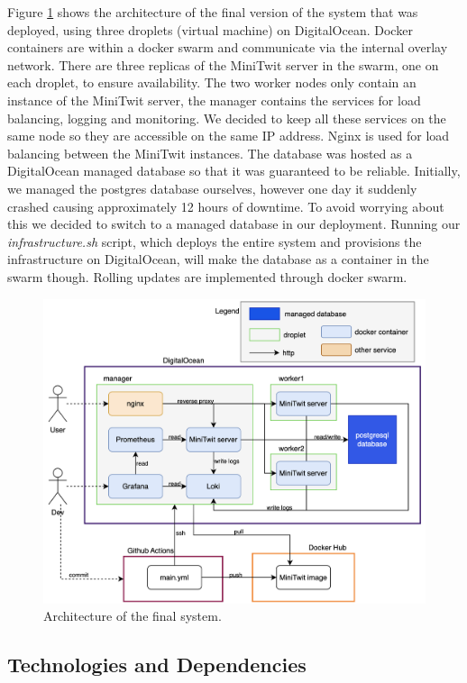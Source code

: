 Figure \ref{fig:architecture} shows the architecture of the final version of the system that was deployed, using three droplets (virtual machine) on DigitalOcean. Docker containers are within a docker swarm and communicate via the internal overlay network. There are three replicas of the MiniTwit server in the swarm, one on each droplet, to ensure availability. The two worker nodes only contain an instance of the MiniTwit server, the manager contains the services for load balancing, logging and monitoring. We decided to keep all these services on the same node so they are accessible on the same IP address. Nginx is used for load balancing between the MiniTwit instances. The database was hosted as a DigitalOcean managed database so that it was guaranteed to be reliable. Initially, we managed the postgres database ourselves, however one day it suddenly crashed causing approximately 12 hours of downtime. To avoid worrying about this we decided to switch to a managed database in our deployment. Running our \textit{infrastructure.sh} script, which deploys the entire system and provisions the infrastructure on DigitalOcean, will make the database as a container in the swarm though. Rolling updates are implemented through docker swarm.

\begin{figure}[H]
    \centering
    \includegraphics[width=\textwidth]{images/architecture2.png}
    \caption{Architecture of the final system.}
    \label{fig:architecture}
\end{figure}

\subsection{Technologies and Dependencies}

